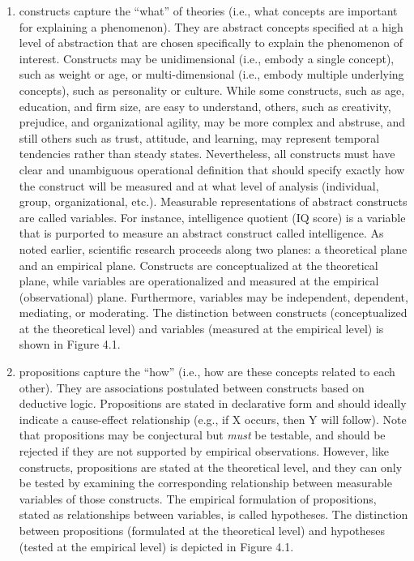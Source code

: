 \begin{enumerate}
	\item \Glspl{construct} capture the ``what'' of theories (i.e., what concepts are important for explaining a phenomenon). They are abstract concepts specified at a high level of abstraction that are chosen specifically to explain the phenomenon of interest. Constructs may be unidimensional (i.e., embody a single concept), such as weight or age, or multi-dimensional (i.e., embody multiple underlying concepts), such as personality or culture. While some constructs, such as age, education, and firm size, are easy to understand, others, such as creativity, prejudice, and organizational agility, may be more complex and abstruse, and still others such as trust, attitude, and learning, may represent temporal tendencies rather than steady states. Nevertheless, all constructs must have clear and unambiguous operational definition that should specify exactly how the construct will be measured and at what level of analysis (individual, group, organizational, etc.). Measurable representations of abstract constructs are called variables. For instance, intelligence quotient (IQ score) is a variable that is purported to measure an abstract construct called intelligence. As noted earlier, scientific research proceeds along two planes: a theoretical plane and an empirical plane. Constructs are conceptualized at the theoretical plane, while variables are operationalized and measured at the empirical (observational) plane. Furthermore, variables may be independent, dependent, mediating, or moderating. The distinction between constructs (conceptualized at the theoretical level) and variables (measured at the empirical level) is shown in Figure 4.1.

	\item \Glspl{proposition} capture the ``how'' (i.e., how are these concepts related to each other). They are associations postulated between constructs based on deductive logic. Propositions are stated in declarative form and should ideally indicate a cause-effect relationship (e.g., if X occurs, then Y will follow). Note that propositions may be conjectural  but \textit{must} be testable, and should be rejected if they are not supported by empirical observations. However, like constructs, propositions are stated at the theoretical level, and they can only be tested by examining the corresponding relationship between measurable variables of those constructs. The empirical formulation of propositions, stated as relationships between variables, is called hypotheses. The distinction between propositions (formulated at the theoretical level) and hypotheses (tested at the empirical level) is depicted in Figure 4.1. 


\end{enumerate}
